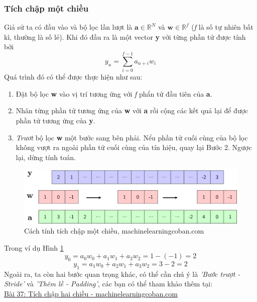 \documentclass{article}
\begin{document}
            \subsubsection{Tích chập một chiều}
            Giả sử ta có đầu vào và bộ lọc lần lượt là $\textbf{a} \in \mathbb{R}^{N}$ và $ \textbf{w} \in \mathbb{R}^{f}$ (\textit{f} là số tự nhiên bất kì, thường là số lẻ). Khi đó đầu ra là một vector \textbf{y} với từng phần tử được tính bởi
            $$ y_{n} = \sum_{i=0}^{f-1} a_{n+i}w_{i}$$
            Quá trình đó có thể được thực hiện như sau:
            \begin{enumerate}
                \item Đặt bộ lọc \textbf{w} vào vị trí tương ứng với \textit{f} phẩn tử đầu tiên của \textbf{a}.
                \item Nhân từng phần tử tương ứng của \textbf{w} với \textbf{a} rồi cộng các kết quả lại để được phần tử tương ứng của \textbf{y}.
                \item \textit{Trươt} bộ lọc \textbf{w} một bước sang bên phải. Nểu phần tử cuối cùng của bộ lọc không vượt ra ngoài phần tử cuối cùng của tín hiệu, quay lại Bước 2. Ngược lại, dừng tính toán.
            \end{enumerate}
            \begin{figure}[ht!]
                \centering
                \includegraphics[width = 0.7\linewidth]{conv1d_viz.png}
                \caption{Cách tính tích chập một chiều, machinelearningcoban.com}
                \label{fig2}
            \end{figure}
            Trong ví dụ Hình \ref{fig2}
            $$ y_{0} = a_{0}w_{0}+a_{1}w_{1}+a_{2}w_{2} = 1 - (-1) = 2$$
            $$ y_{1} = a_{1}w_{0}+a_{2}w_{1}+a_{3}w_{2} = 3-2 = 2$$
            Ngoài ra, ta còn hai bước quan trọng khác, có thể cần chú ý là \textit{'Bước trượt - Stride'} và \textit{'Thêm lề - Padding'}, các bạn có thể tham khảo thêm tại: \\ \href{https://machinelearningcoban.com/2018/10/03/conv2d}{Bài 37: Tích chập hai chiều - machinelearningcoban.com}
\end{document}
